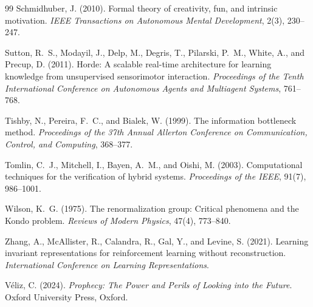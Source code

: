 \documentclass[11pt, a4paper]{article}
\theoremstyle{plain}
\theoremstyle{definition}
\theoremstyle{remark}
\begin{document}
\begin{thebibliography}{99}
Schmidhuber, J. (2010).
Formal theory of creativity, fun, and intrinsic motivation.
\textit{IEEE Transactions on Autonomous Mental Development}, 2(3), 230--247.

Sutton, R.~S., Modayil, J., Delp, M., Degris, T., Pilarski, P.~M.,
White, A., and Precup, D. (2011).
Horde: A scalable real-time architecture for learning knowledge from unsupervised
sensorimotor interaction.
\textit{Proceedings of the Tenth International Conference on Autonomous Agents
and Multiagent Systems}, 761--768.

Tishby, N., Pereira, F.~C., and Bialek, W. (1999).
The information bottleneck method.
\textit{Proceedings of the 37th Annual Allerton Conference on Communication,
Control, and Computing}, 368--377.

Tomlin, C.~J., Mitchell, I., Bayen, A.~M., and Oishi, M. (2003).
Computational techniques for the verification of hybrid systems.
\textit{Proceedings of the IEEE}, 91(7), 986--1001.

Wilson, K.~G. (1975).
The renormalization group: Critical phenomena and the Kondo problem.
\textit{Reviews of Modern Physics}, 47(4), 773--840.

Zhang, A., McAllister, R., Calandra, R., Gal, Y., and Levine, S. (2021).
Learning invariant representations for reinforcement learning without
reconstruction.
\textit{International Conference on Learning Representations}.

V\'eliz, C. (2024).
\textit{Prophecy: The Power and Perils of Looking into the Future}.
Oxford University Press, Oxford.

\end{thebibliography}
\end{document}
